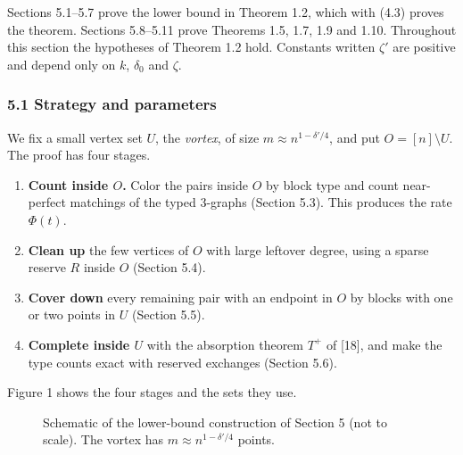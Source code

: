 \documentclass[english,11pt,a4paper]{article}
\providecommand{\tightlist}{\setlength{\itemsep}{0pt}\setlength{\parskip}{0pt}}
\begin{document}
Sections 5.1--5.7 prove the lower bound in Theorem 1.2, which with (4.3) proves the theorem. Sections 5.8--5.11 prove Theorems 1.5, 1.7, 1.9 and 1.10. Throughout this section the hypotheses of Theorem 1.2 hold. Constants written \(\zeta'\) are positive and depend only on \(k\), \(\delta_0\) and \(\zeta\).

\subsubsection{5.1 Strategy and parameters}\label{strategy-and-parameters}

We fix a small vertex set \(U\), the \emph{vortex}, of size \(m\approx n^{1-\delta'/4}\), and put \(O=[n]\setminus U\). The proof has four stages.

\begin{enumerate}
\def\labelenumi{\arabic{enumi}.}
\tightlist
\item
  \textbf{Count inside \(O\).} Color the pairs inside \(O\) by block type and count near-perfect matchings of the typed 3-graphs (Section 5.3). This produces the rate \(\Phi(t)\).
\item
  \textbf{Clean up} the few vertices of \(O\) with large leftover degree, using a sparse reserve \(R\) inside \(O\) (Section 5.4).
\item
  \textbf{Cover down} every remaining pair with an endpoint in \(O\) by blocks with one or two points in \(U\) (Section 5.5).
\item
  \textbf{Complete inside \(U\)} with the absorption theorem \(T^+\) of {[}18{]}, and make the type counts exact with reserved exchanges (Section 5.6).
\end{enumerate}

Figure 1 shows the four stages and the sets they use.

\begin{figure}[htbp]
\centering
{}
\caption{Schematic of the lower-bound construction of Section 5 (not to scale). The vortex has $m\approx n^{1-\delta'/4}$ points.}
\end{figure}
\end{document}
